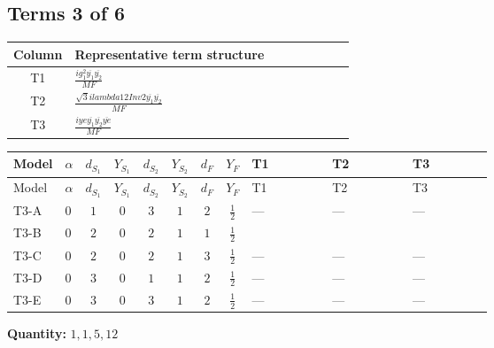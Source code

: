 \documentclass[8pt]{article}
\begin{document}
\begin{landscape}
\subsection*{Terms 3 of 6}
\begin{center}
\begin{tabular}{@{}c >{\raggedright\arraybackslash}p{0.82\linewidth}@{}}
\toprule
Column & Representative term structure \\
\midrule
T1 & \(\displaystyle \frac{i g_{1}^{2} \overline{y_{1}} \overline{y_{2}}}{MF}\) \\
\midrule
T2 & \(\displaystyle \frac{\sqrt{3} i lambda12Inv2 \overline{y_{1}} \overline{y_{2}}}{MF}\) \\
\midrule
T3 & \(\displaystyle \frac{i ye \overline{y_{1}} \overline{y_{2}} \overline{ye}}{MF}\) \\
\midrule
\bottomrule
\end{tabular}
\end{center}
\smallskip
\tiny
\begin{longtable}{@{}llcccccc >{\raggedright\arraybackslash}p{0.21\linewidth} >{\raggedright\arraybackslash}p{0.21\linewidth} >{\raggedright\arraybackslash}p{0.21\linewidth}@{}}
\toprule
Model & $\alpha$ & $d_{S_1}$ & $Y_{S_1}$ & $d_{S_2}$ & $Y_{S_2}$ & $d_F$ & $Y_F$ & T1 & T2 & T3 \\
\midrule
\endfirsthead
\toprule
Model & $\alpha$ & $d_{S_1}$ & $Y_{S_1}$ & $d_{S_2}$ & $Y_{S_2}$ & $d_F$ & $Y_F$ & T1 & T2 & T3 \\
\midrule
\endhead
T3-A & $0$ & $1$ & $0$ & $3$ & $1$ & $2$ & $\frac{1}{2}$ & --- & --- & --- \\
\midrule
T3-B & $0$ & $2$ & $0$ & $2$ & $1$ & $1$ & $\frac{1}{2}$ & \scriptsize\adjustbox{max width=\linewidth}{$\begin{gathered} - \frac{3 i g_{1}^{2} \overline{y_{1}} \overline{y_{2}}}{8 MF}\end{gathered}$} & \scriptsize\adjustbox{max width=\linewidth}{$\begin{gathered} - \frac{\sqrt{3} i lambda12Inv2 \overline{y_{1}} \overline{y_{2}}}{3 MF}\end{gathered}$} & \scriptsize\adjustbox{max width=\linewidth}{$\begin{gathered} \frac{i ye \overline{y_{1}} \overline{y_{2}} \overline{ye}}{4 MF}\end{gathered}$} \\
\midrule
T3-C & $0$ & $2$ & $0$ & $2$ & $1$ & $3$ & $\frac{1}{2}$ & --- & --- & --- \\
\midrule
T3-D & $0$ & $3$ & $0$ & $1$ & $1$ & $2$ & $\frac{1}{2}$ & --- & --- & --- \\
\midrule
T3-E & $0$ & $3$ & $0$ & $3$ & $1$ & $2$ & $\frac{1}{2}$ & --- & --- & --- \\
\midrule
\bottomrule
\end{longtable}
\clearpage
\noindent\textbf{Quantity: }$\mathrm{1,1,5,12}$\par\smallskip

\end{landscape}
\end{document}
